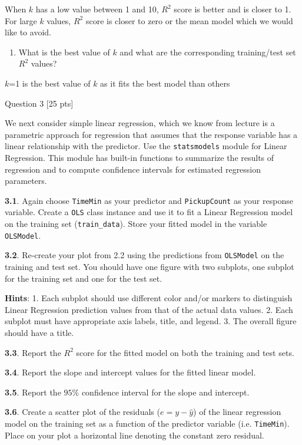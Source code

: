 \documentclass[11pt]{article}
\providecommand{\tightlist}{%
      \setlength{\itemsep}{0pt}\setlength{\parskip}{0pt}}
\begin{document}
When \(k\) has a low value between 1 and 10, \(R^2\) score is better and
is closer to 1. For large \(k\) values, \(R^2\) score is closer to zero
or the mean model which we would like to avoid.

\begin{enumerate}
\def\labelenumi{\arabic{enumi}.}
\setcounter{enumi}{5}
\tightlist
\item
  What is the best value of \(k\) and what are the corresponding
  training/test set \(R^2\) values?
\end{enumerate}

\(k\)=1 is the best value of \(k\) as it fits the best model than others

     Question 3 {[}25 pts{]}

We next consider simple linear regression, which we know from lecture is
a parametric approach for regression that assumes that the response
variable has a linear relationship with the predictor. Use the
\texttt{statsmodels} module for Linear Regression. This module has
built-in functions to summarize the results of regression and to compute
confidence intervals for estimated regression parameters.

\textbf{3.1}. Again choose \texttt{TimeMin} as your predictor and
\texttt{PickupCount} as your response variable. Create a \texttt{OLS}
class instance and use it to fit a Linear Regression model on the
training set (\texttt{train\_data}). Store your fitted model in the
variable \texttt{OLSModel}.

\textbf{3.2}. Re-create your plot from 2.2 using the predictions from
\texttt{OLSModel} on the training and test set. You should have one
figure with two subplots, one subplot for the training set and one for
the test set.

\textbf{Hints}: 1. Each subplot should use different color and/or
markers to distinguish Linear Regression prediction values from that of
the actual data values. 2. Each subplot must have appropriate axis
labels, title, and legend. 3. The overall figure should have a title.

\textbf{3.3}. Report the \(R^2\) score for the fitted model on both the
training and test sets.

\textbf{3.4}. Report the slope and intercept values for the fitted
linear model.

\textbf{3.5}. Report the \(95\%\) confidence interval for the slope and
intercept.

\textbf{3.6}. Create a scatter plot of the residuals
(\(e = y - \hat{y}\)) of the linear regression model on the training set
as a function of the predictor variable (i.e. \texttt{TimeMin}). Place
on your plot a horizontal line denoting the constant zero residual.
\end{document}
